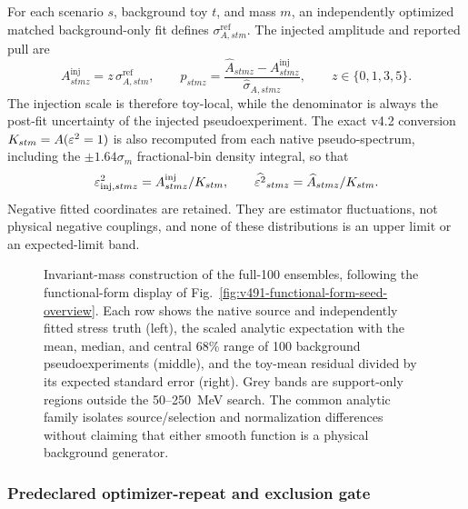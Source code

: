 For each scenario $s$, background toy $t$, and mass $m$, an independently optimized
matched background-only fit defines $\sigma^{\mathrm{ref}}_{A,stm}$.  The injected
amplitude and reported pull are
\begin{equation}
 A^{\mathrm{inj}}_{stmz}=z\,\sigma^{\mathrm{ref}}_{A,stm},
 \qquad
 p_{stmz}=\frac{\widehat A_{stmz}-A^{\mathrm{inj}}_{stmz}}
 {\widehat\sigma_{A,stmz}},
 \qquad z\in\{0,1,3,5\}.
 \label{eq:v501-v4p6-refmatched-pull}
\end{equation}
The injection scale is therefore toy-local, while the denominator is always the
post-fit uncertainty of the injected pseudoexperiment.  The exact v4.2 conversion
$K_{stm}=A(\varepsilon^2=1)$ is also recomputed from each native pseudo-spectrum, including
the $\pm1.64\sigma_m$ fractional-bin density integral, so that
\begin{equation}
 \varepsilon^2_{\mathrm{inj},stmz}=A^{\mathrm{inj}}_{stmz}/K_{stm},
 \qquad
 \widehat{\varepsilon^2}_{stmz}=\widehat A_{stmz}/K_{stm}.
 \label{eq:v501-v4p6-eps2-coordinate}
\end{equation}
Negative fitted coordinates are retained.  They are estimator fluctuations, not
physical negative couplings, and none of these distributions is an upper limit or an
expected-limit band.

\begin{figure}[p]
\centering
{}
\caption{Invariant-mass construction of the full-100 ensembles, following the
functional-form display of Fig.~\ref{fig:v491-functional-form-seed-overview}.  Each row
shows the native source and independently fitted stress truth (left), the scaled
analytic expectation with the mean, median, and central 68\% range of 100 background
pseudoexperiments (middle), and the toy-mean residual divided by its expected standard
error (right).  Grey bands are support-only regions outside the 50--250~MeV search.
The common analytic family isolates source/selection and normalization differences
without claiming that either smooth function is a physical background generator.}
\label{fig:v501-v4p6-functional-form-exposure-distributions}
\end{figure}

\subsubsection{Predeclared optimizer-repeat and exclusion gate}

